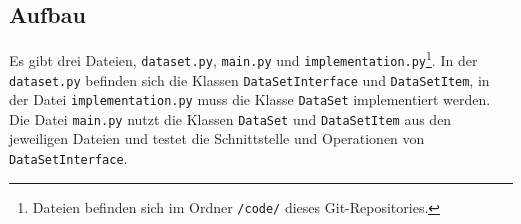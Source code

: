 \documentclass[10pt, a4paper, parskip=full]{article}
\begin{document}
\subsection{Aufbau} 
Es gibt drei Dateien, \lstinline{dataset.py}, \lstinline{main.py} und \lstinline{implementation.py}\footnote{Dateien befinden sich im Ordner \lstinline{/code/} dieses Git-Repositories.}.
In der \lstinline{dataset.py} befinden sich die Klassen \lstinline{DataSetInterface} und \lstinline{DataSetItem},
in der Datei \lstinline{implementation.py} muss die Klasse \lstinline{DataSet} implementiert werden.
Die Datei \lstinline{main.py} nutzt die Klassen \lstinline{DataSet} und \lstinline{DataSetItem} aus den jeweiligen Dateien und testet die Schnittstelle und Operationen von \lstinline{DataSetInterface}.\\
\end{document}

